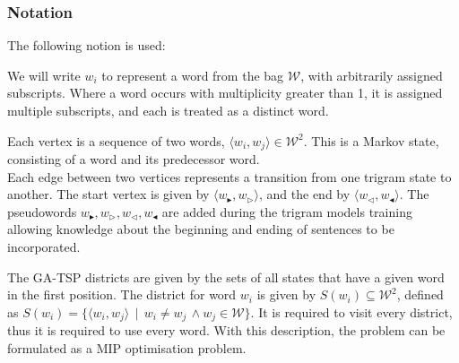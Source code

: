 \documentclass[twocolumn]{article}
\begin{document}
\newcommand{\s}{w_{\blacktriangleright}}
\renewcommand{\ss}{w_{\triangleright}}
\newcommand{\e}{w_{\triangleleft}}
\newcommand{\ee}{w_{\blacktriangleleft}}
\newcommand{\W}{\mathcal{W}}

\newcommand{\displayunskip}{\vspace{0pt}} %

\subsubsection{Notation}

The following notion is used:

We will write $w_{i}$ to represent a word from the bag \textbf{$\W$}, with
arbitrarily assigned subscripts. Where a word occurs with multiplicity
greater than 1, it is assigned multiple subscripts, and each is treated
as a distinct word.

Each vertex is a sequence of two words, $\langle w_{i},w_{j}\rangle\in\W^{2}$.
This is a Markov state, consisting of a word and its predecessor word. \\
Each edge between two vertices represents a transition from one trigram state to another.
The start vertex is given by $\langle\s,\ss\rangle$, and the end by $\langle\e,\ee\rangle$. The pseudowords  $\s,\ss,\e,\ee$ are added during the trigram models training allowing knowledge about the beginning and ending of sentences to be incorporated.

The GA-TSP districts are given by the sets of all states that have
a given word in the first position. The district for word $w_{i}$
is given by $S(w_{i})\subseteq\W^{2}$, defined as $S(w_{i})=\{\langle w_{i},w_{j}\rangle\,\mid\,w_{i}\ne w_{j}\,\wedge w_{j}\in\W\}$. It is required to visit every district, thus it is required to use every word.
With this description, the problem can be formulated as a MIP optimisation problem.
\end{document}
